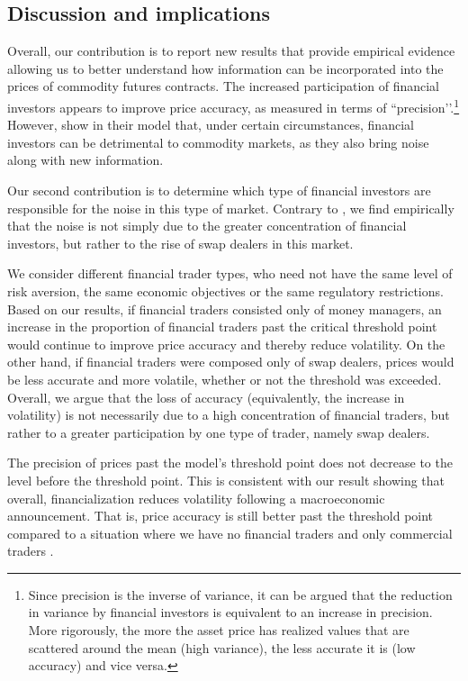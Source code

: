 \documentclass[12pt]{article}
\begin{document}
\subsection{Discussion and implications}
Overall, our contribution is to report new results that provide empirical evidence allowing us to better understand how information can be incorporated into the prices of commodity futures contracts. The increased participation of financial investors appears to improve price accuracy, as measured in terms of ``precision’’.\footnote{Since precision is the inverse of variance, it can be argued that the reduction in variance by financial investors is equivalent to an increase in precision. More rigorously, the more the asset price has realized values that are scattered around the mean (high variance), the less accurate it is (low accuracy) and vice versa.} However, \citet{goldstein2022commodity} show in their model that, under certain circumstances, financial investors can be detrimental to commodity markets, as they also bring noise along with new information. 
 
Our second contribution is to determine which type of financial investors are responsible for the noise in this type of market. Contrary to \citet{goldstein2022commodity}, we find empirically that the noise is not simply due to the greater concentration of financial investors, but rather to the rise of swap dealers in this market.
 

We consider different financial trader types, who need not have the same level of risk aversion, the same economic objectives or the same regulatory restrictions. Based on our results, if financial traders consisted only of money managers, an increase in the proportion of financial traders past the critical threshold point \citep[see the model in ][]{goldstein2022commodity} would continue to improve price accuracy and thereby reduce volatility. On the other hand, if financial traders were composed only of swap dealers, prices would be less accurate and more volatile, whether or not the threshold was exceeded. Overall, we argue that the loss of accuracy (equivalently, the increase in volatility) is not necessarily due to a high concentration of financial traders, but rather to a greater participation by one type of trader, namely swap dealers.

The precision of prices past the model’s threshold point does not decrease to the level before the threshold point. This is consistent with our result showing that overall, financialization reduces volatility following a macroeconomic announcement. That is, price accuracy is still better past the threshold point compared to a situation where we have no financial traders and only commercial traders \citep[see also the model in ][]{kang2020tale}.
\end{document}
